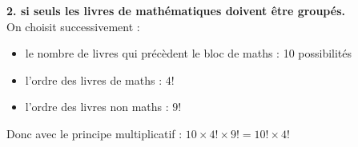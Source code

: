 \documentclass[11pt,a4paper]{article}
\begin{document}
\vspace{0.3cm}
\noindent \textbf{2. si seuls les livres de mathématiques doivent être groupés.} \\
On choisit successivement :
\begin{itemize}
    \item le nombre de livres qui précèdent le bloc de maths : 10 possibilités
    
    \item l'ordre des livres de maths : $4!$
    
    \item l'ordre des livres non maths : $9!$
\end{itemize}
Donc avec le principe multiplicatif : $10 \times 4! \times 9! = 10! \times 4!$

\vspace{0.5cm}
\end{document}
